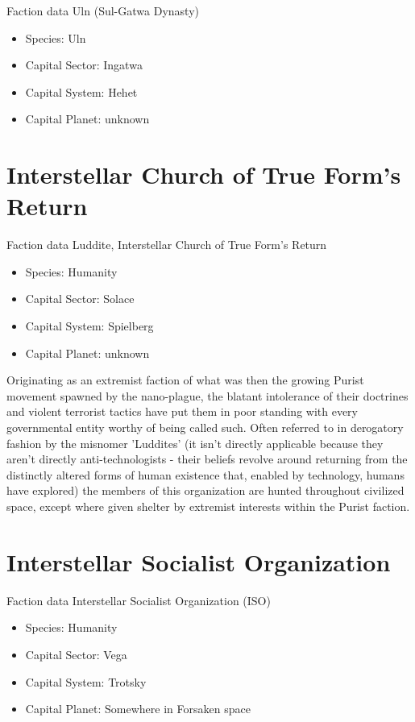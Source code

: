 Faction data Uln (Sul-Gatwa Dynasty)
\begin{itemize}
\item Species: Uln
\item Capital Sector: Ingatwa
\item Capital System: Hehet
\item Capital Planet: unknown
\end{itemize}

\section{Interstellar Church of True Form's Return}

Faction data Luddite, Interstellar Church of True Form's Return
\begin{itemize}
\item Species: Humanity
\item Capital Sector: Solace
\item Capital System: Spielberg
\item Capital Planet: unknown
\end{itemize}

Originating as an extremist faction of what was then the growing
Purist movement spawned by the nano-plague, the blatant intolerance of
their doctrines and violent terrorist tactics have put them in poor
standing with every governmental entity worthy of being called
such. Often referred to in derogatory fashion by the misnomer
'Luddites' (it isn't directly applicable because they aren't directly
anti-technologists - their beliefs revolve around returning from the
distinctly altered forms of human existence that, enabled by
technology, humans have explored) the members of this organization are
hunted throughout civilized space, except where given shelter by
extremist interests within the Purist faction.

 
\section{Interstellar Socialist Organization}

Faction data Interstellar Socialist Organization (ISO) 
\begin{itemize}
\item Species: Humanity
\item Capital Sector: Vega
\item Capital System: Trotsky
\item Capital Planet: Somewhere in Forsaken space
\end{itemize}

